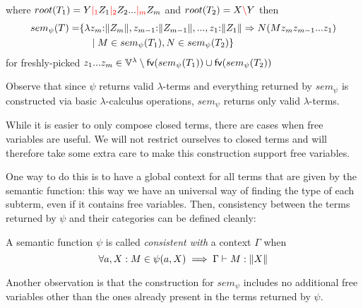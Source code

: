 \documentclass[main.tex]{subfiles}
\begin{document}
\begin{defn}
\begin{enumerate}
\begin{center}
            \end{center}
            where $root(T_1) = Y \textcolor{red}{|_{1}} Z_1 \textcolor{red}{|_{2}} Z_2 ... \textcolor{red}{|_{m}} Z_m$ and $root(T_2) = X \textcolor{red}{\backslash} Y$ then
            \[
                \begin{split}
                    sem_{\psi}(T) =& \{
                        \lambda z_m {:} \|Z_m\|, z_{m - 1} {:} \|Z_{m - 1}\|, ..., z_1 {:} \|Z_1\| \Rightarrow
                        N ( M z_m z_{m - 1} ... z_1 ) \\
                        & \quad \mid M \in sem_{\psi}(T_1), N \in sem_{\psi}(T_2) \} \\
                \end{split}
            \]
            for freshly-picked
            $z_1 ... z_m \in \mathbb{V}^{\lambda} \setminus \mathsf{fv}(sem_{\psi}(T_1)) \cup \mathsf{fv}(sem_{\psi}(T_2))$
    \end{enumerate}
\end{defn}

Observe that since $\psi$ returns valid $\lambda$-terms and everything
returned by $sem_{\psi}$ is constructed via basic $\lambda$-calculus operations,
$sem_{\psi}$ returns only valid $\lambda$-terms.

While it is easier to only compose closed terms, there are cases when free
variables are useful. We will not restrict ourselves to closed terms and will
therefore take some extra care to make this construction support free variables.

One way to do this is to have a global context for all terms that are given
by the semantic function: this way we have an universal way of finding the
type of each subterm, even if it contains free variables. Then, consistency
between the terms returned by $\psi$ and their categories can be defined
cleanly:

\begin{defn}
    A semantic function $\psi$ is called \emph{consistent with} a context
    $\Gamma$ when
    \[
        \forall a, X: M \in \psi(a, X) \implies \Gamma \vdash M : \|X\|
    \]
\end{defn}

Another observation is that the construction for $sem_{\psi}$ includes no
additional free variables other than the ones already present in the terms
returned by $\psi$.
\end{document}
